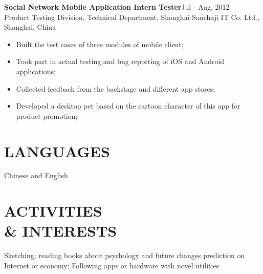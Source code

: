 \documentclass[line,margin]{res}
\begin{document}
\begin{resume}
{\bf Social Network Mobile Application Intern Tester}\hfill{\textcolor[rgb]{0.7,0.7,0.7}{Jul - Aug, 2012}} \\
 Product Testing Division, Technical Department, Shanghai Sanchaji IT Co. Ltd., Shanghai, China
                \begin{itemize}  \itemsep -2pt %
                \item  Built the test cases of three modules of mobile client;
                \item  Took part in actual testing and bug reporting of iOS and Android applications;
                \item  Collected feedback from the backstage and different app stores;
                \item  Developed a desktop pet based on the cartoon character of this app for product promotion;
                \end{itemize}

\section{LANGUAGES}
Chinese and English

\section{ACTIVITIES \\ \& INTERESTS} 
Sketching; reading books about psychology and future changes prediction on Internet or economy; Following apps or hardware with novel utilities

\end{resume}
\end{document}
